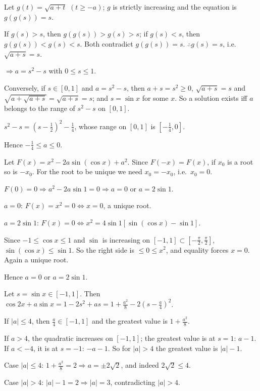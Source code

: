   Let $g(t) = \sqrt{a + t}$ $(t\ge -a)$; $g$ is strictly increasing and the equation is $g(g(s)) = s$.

  If $g(s) > s$, then $g(g(s)) > g(s) > s$; if $g(s) < s$, then $g(g(s)) < g(s) < s$. Both contradict $g(g(s)) =
  s$. $\therefore g(s) = s$, i.e.\ $\sqrt{a + s} = s$.

  $\Rightarrow a = s^2 - s$ with $0\le s\le 1$.

  Conversely, if $s\in[0, 1]$ and $a = s^2 - s$, then $a + s = s^2\ge 0$, $\sqrt{a + s} = s$ and $\sqrt{a + \sqrt{a
  + s}} = \sqrt{a + s} = s$; and $s = \sin x$ for some $x$. So a solution exists iff $a$ belongs to the range of
  $s^2 - s$ on $[0, 1]$.

  $s^2 - s = \left(s - \frac{1}{2}\right)^2 - \frac{1}{4}$, whose range on $[0, 1]$ is $\left[-\frac{1}{4},
  0\right]$.

  Hence $-\frac{1}{4}\le a\le 0$.
\item Let $F(x) = x^2 - 2a\sin(\cos x) + a^2$. Since $F(-x) = F(x)$, if $x_0$ is a root so is $-x_0$. For the
  root to be unique we need $x_0 = -x_0$, i.e.\ $x_0 = 0$.

  $F(0) = 0\Rightarrow a^2 - 2a\sin1 = 0\Rightarrow a = 0$ or $a = 2\sin1$.

  $a = 0$: $F(x) = x^2 = 0\Leftrightarrow x = 0$, a unique root.

  $a = 2\sin1$: $F(x) = 0\Leftrightarrow x^2 = 4\sin1\left[\sin(\cos x) - \sin1\right]$.

  Since $-1\le\cos x\le 1$ and $\sin$ is increasing on $[-1, 1]\subset\left[-\frac{\pi}{2}, \frac{\pi}{2}\right]$,
  $\sin(\cos x)\le\sin1$. So the right side is $\le 0\le x^2$, and equality forces $x = 0$. Again a unique root.

  Hence $a = 0$ or $a = 2\sin1$.
\item Let $s = \sin x\in[-1, 1]$. Then $\cos2x + a\sin x = 1 - 2s^2 + as = 1 + \frac{a^2}{8} - 2\left(s -
  \frac{a}{4}\right)^2$.

  If $|a|\le 4$, then $\frac{a}{4}\in[-1, 1]$ and the greatest value is $1 + \frac{a^2}{8}$.

  If $a > 4$, the quadratic increases on $[-1, 1]$; the greatest value is at $s = 1$: $a - 1$. If $a < -4$, it is at
  $s = -1$: $-a - 1$. So for $|a| > 4$ the greatest value is $|a| - 1$.

  Case $|a|\le 4$: $1 + \frac{a^2}{8} = 2\Rightarrow a = \pm2\sqrt{2}$, and indeed $2\sqrt{2}\le 4$.

  Case $|a| > 4$: $|a| - 1 = 2\Rightarrow |a| = 3$, contradicting $|a| > 4$.

